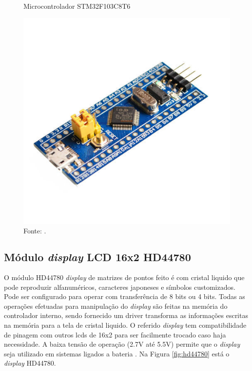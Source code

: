         \begin{figure}[H]
            \centering
            \caption{Microcontrolador STM32F103C8T6}
            \label{fig:micro}
            \includegraphics[scale=0.5]{imagens/micro.jpg}
            \caption*{Fonte: .}

        \end{figure}
        
	\subsection{Módulo \textit{display} LCD 16x2 HD44780}
	
	    O módulo HD44780 \textit{display} de matrizes de pontos feito é com cristal liquido que pode reproduzir alfanuméricos, caracteres japoneses e símbolos customizados. Pode ser configurado para operar com transferência de 8 bits ou 4 bits. Todas as operações efetuadas para manipulação do \textit{display} são feitas na memória do controlador interno, sendo fornecido um driver transforma as informações escritas na memória para a tela de cristal liquido. O referido \textit{display} tem compatibilidade de pinagem com outros lcds de 16x2 para ser facilmente trocado caso haja necessidade. A baixa tensão de operação (2.7V até 5.5V) permite que o \textit{display} seja utilizado em sistemas ligados a bateria \cite{hitachi}.
    	Na Figura \ref{fig:hd44780} está o \textit{display} HD44780.
    	
